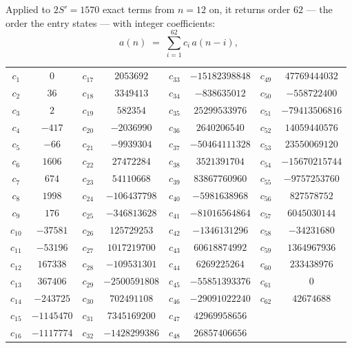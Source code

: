 \documentclass[11pt,a4paper]{article}
\theoremstyle{plain}
\theoremstyle{definition}
\begin{document}
Applied to $2S'=1570$ exact terms from $n=12$ on, it returns order $62$ --- the
order the entry states --- with integer coefficients:
\[
a(n)\;=\;\sum_{i=1}^{62}c_i\,a(n-i),
\]
\begin{center}\small
\begin{tabular}{cccccccc}
$c_{1}$ & $0$ & $c_{17}$ & $2053692$ & $c_{33}$ & $-15182398848$ & $c_{49}$ & $47769444032$ \\
$c_{2}$ & $36$ & $c_{18}$ & $3349413$ & $c_{34}$ & $-838635012$ & $c_{50}$ & $-558722400$ \\
$c_{3}$ & $2$ & $c_{19}$ & $582354$ & $c_{35}$ & $25299533976$ & $c_{51}$ & $-79413506816$ \\
$c_{4}$ & $-417$ & $c_{20}$ & $-2036990$ & $c_{36}$ & $2640206540$ & $c_{52}$ & $14059440576$ \\
$c_{5}$ & $-66$ & $c_{21}$ & $-9939304$ & $c_{37}$ & $-50464111328$ & $c_{53}$ & $23550069120$ \\
$c_{6}$ & $1606$ & $c_{22}$ & $27472284$ & $c_{38}$ & $3521391704$ & $c_{54}$ & $-15670215744$ \\
$c_{7}$ & $674$ & $c_{23}$ & $54110668$ & $c_{39}$ & $83867760960$ & $c_{55}$ & $-9757253760$ \\
$c_{8}$ & $1998$ & $c_{24}$ & $-106437798$ & $c_{40}$ & $-5981638968$ & $c_{56}$ & $827578752$ \\
$c_{9}$ & $176$ & $c_{25}$ & $-346813628$ & $c_{41}$ & $-81016564864$ & $c_{57}$ & $6045030144$ \\
$c_{10}$ & $-37581$ & $c_{26}$ & $125729253$ & $c_{42}$ & $-1346131296$ & $c_{58}$ & $-34231680$ \\
$c_{11}$ & $-53196$ & $c_{27}$ & $1017219700$ & $c_{43}$ & $60618874992$ & $c_{59}$ & $1364967936$ \\
$c_{12}$ & $167338$ & $c_{28}$ & $-109531301$ & $c_{44}$ & $6269225264$ & $c_{60}$ & $233438976$ \\
$c_{13}$ & $367406$ & $c_{29}$ & $-2500591808$ & $c_{45}$ & $-55851393376$ & $c_{61}$ & $0$ \\
$c_{14}$ & $-243725$ & $c_{30}$ & $702491108$ & $c_{46}$ & $-29091022240$ & $c_{62}$ & $42674688$ \\
$c_{15}$ & $-1145470$ & $c_{31}$ & $7345169200$ & $c_{47}$ & $42969958656$ &  &  \\
$c_{16}$ & $-1117774$ & $c_{32}$ & $-1428299386$ & $c_{48}$ & $26857406656$ &  &  \\
\end{tabular}
\end{center}
\end{document}

